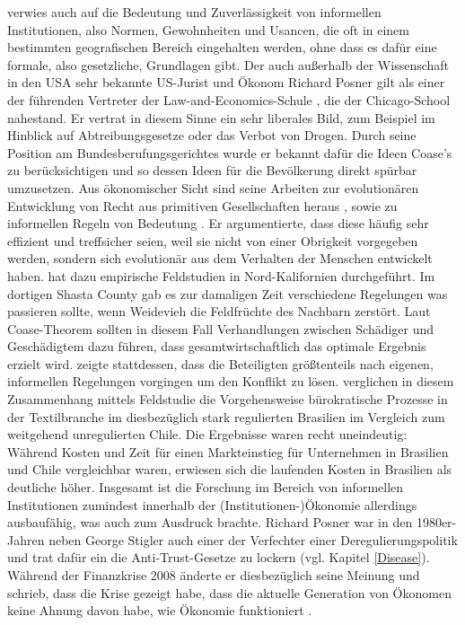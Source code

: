 \textcite[S. 43]{North1990} verwies auch auf die Bedeutung und Zuverlässigkeit von informellen Institutionen, also Normen, Gewohnheiten und Usancen, die oft in einem bestimmten geografischen Bereich eingehalten werden, ohne dass es dafür eine formale, also gesetzliche, Grundlagen gibt. Der auch außerhalb der Wissenschaft in den USA sehr bekannte US-Jurist und Ökonom Richard Posner gilt als einer der führenden Vertreter der Law-and-Economics-Schule \parencite[S. 263]{Warsh}, die der Chicago-School nahestand. Er vertrat in diesem Sinne ein sehr liberales Bild, zum Beispiel im Hinblick auf Abtreibungsgesetze oder das Verbot von Drogen. Durch seine Position am Bundesberufungsgerichtes wurde er bekannt dafür die Ideen Coase's zu berücksichtigen und so dessen Ideen für die Bevölkerung direkt spürbar umzusetzen. Aus ökonomischer Sicht sind seine Arbeiten zur evolutionären Entwicklung von Recht aus primitiven Gesellschaften heraus \parencite{Posner1980}, sowie zu informellen Regeln von Bedeutung \parencite{Posner1983}. Er argumentierte, dass diese häufig sehr effizient und treffsicher seien, weil sie nicht von einer Obrigkeit vorgegeben werden, sondern sich evolutionär aus dem Verhalten der Menschen entwickelt haben. \textcite{Ellickson1991, Ellickson1994} hat dazu empirische Feldstudien in Nord-Kalifornien durchgeführt. Im dortigen Shasta County gab es zur damaligen Zeit verschiedene Regelungen was passieren sollte, wenn Weidevieh die Feldfrüchte des Nachbarn zerstört. Laut Coase-Theorem sollten in diesem Fall Verhandlungen zwischen Schädiger und Geschädigtem dazu führen, dass gesamtwirtschaftlich das optimale Ergebnis erzielt wird. \textcite{Ellickson1991} zeigte stattdessen, dass die Beteiligten größtenteils nach eigenen, informellen Regelungen vorgingen um den Konflikt zu lösen. \textcite{Stone1996} verglichen in diesem Zusammenhang mittels Feldstudie die Vorgehensweise bürokratische Prozesse in der Textilbranche im diesbezüglich stark regulierten Brasilien im Vergleich zum weitgehend unregulierten Chile. Die Ergebnisse waren recht uneindeutig: Während Kosten und Zeit für einen Markteinstieg für Unternehmen in Brasilien und Chile vergleichbar waren, erwiesen sich die laufenden Kosten in Brasilien als deutliche höher. Insgesamt ist die Forschung im Bereich von informellen Institutionen zumindest innerhalb der (Institutionen-)Ökonomie allerdings ausbaufähig, was \textcite{North1990} auch zum Ausdruck brachte. Richard Posner war in den 1980er-Jahren neben George Stigler auch einer der Verfechter einer Deregulierungspolitik und trat dafür ein die Anti-Trust-Gesetze zu lockern (vgl. Kapitel \ref{Disease}). Während der Finanzkrise 2008 änderte er diesbezüglich seine Meinung und schrieb, dass die Krise gezeigt habe, dass die aktuelle Generation von Ökonomen keine Ahnung davon habe, wie Ökonomie funktioniert \parencite{Posner1999}.

